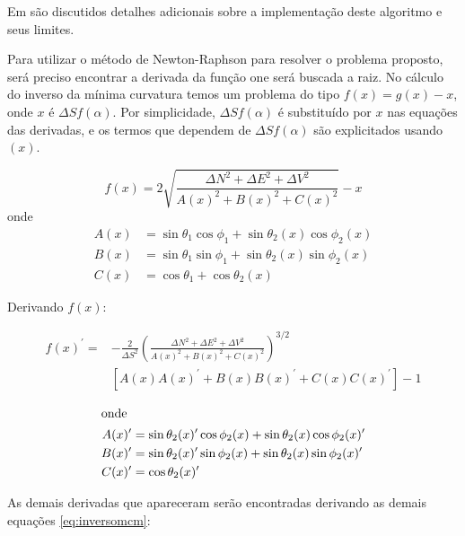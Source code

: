 \documentclass[final,5p]{elsarticle}
\numberwithin{equation}{section}
\begin{document}
Em \cite{relatoriobisseccao} são discutidos detalhes adicionais sobre a implementação deste algoritmo e seus limites. 

Para utilizar o método de Newton-Raphson para resolver o problema proposto, será preciso encontrar a derivada da função one será buscada a raiz. No cálculo do inverso da mínima curvatura temos um problema do tipo $f(x) = g(x) - x$, onde $x$ é $\Delta S f(\alpha)$. Por simplicidade, $\Delta S f(\alpha)$ é substituído por $x$ nas equações das derivadas, e os termos que dependem de $\Delta S f(\alpha)$ são explicitados usando $(x)$.

\begin{equation} \label{eq:fx}
    f(x) = 2 \sqrt{\frac{\Delta N^2 + \Delta E^2 + \Delta V^2}{A(x)^2+B(x)^2+C(x)^2}} - x
\end{equation}
onde
\begin{align*}
    A(x) &= \sin \theta_1 \cos \phi_1 + \sin \theta_2(x) \cos \phi_2(x) \\
    B(x) &= \sin \theta_1 \sin \phi_1 + \sin \theta_2(x) \sin \phi_2(x) \\
    C(x) &= \cos \theta_1 + \cos \theta_2(x)
\end{align*}

Derivando $f(x)$:

\begin{align} \label{eq:fxprime}
    f(x)^{\prime} =& - \frac{2}{\Delta S^2} \left( \frac{ \Delta N^2 + \Delta E^2 + \Delta V^2}{A(x)^2+B(x)^2+C(x)^2} \right) ^{3/2} \nonumber \\
    & [A(x)A(x)^{\prime}+B(x)B(x)^{\prime}+C(x)C(x)^{\prime}] - 1
\end{align}

\begin{align*}
    \intertext{onde}
    A(x)^{\prime} &= \sin \theta_2(x)^{\prime} \cos \phi_2(x) + \sin \theta_2(x) \cos \phi_2(x)^{\prime} \\
    B(x)^{\prime} &= \sin \theta_2(x)^{\prime} \sin \phi_2(x) + \sin \theta_2(x) \sin \phi_2(x)^{\prime} \\
    C(x)^{\prime} &= \cos \theta_2(x)^{\prime}
\end{align*}

As demais derivadas que apareceram serão encontradas derivando as demais equações \ref{eq:inversomcm}:
\end{document}

